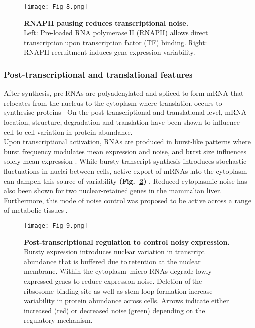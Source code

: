 \begin{figure}[!h]
\centering
\texttt{[image: Fig\_8.png]}
\caption[RNAPII pausing reduces transcriptional noise]{\textbf{RNAPII pausing reduces transcriptional noise.}\\
Left: Pre-loaded RNA polymerase II (RNAPII) allows direct transcription upon transcription factor (TF) binding. 
Right: RNAPII recruitment induces gene expression variability.}
\label{fig0:RNAPII}
\end{figure} 

\newpage

\subsubsection{Post-transcriptional and translational features}

After synthesis, pre-RNAs are polyadenylated and spliced to form mRNA that relocates from the nucleus to the cytoplasm where translation occurs to synthesise proteins \cite{Glisovic2008}. 
On the post-transcriptional and translational level, mRNA location, structure, degradation and translation have been shown to influence cell-to-cell variation in protein abundance.\\

Upon transcriptional activation, RNAs are produced in burst-like patterns where burst frequency modulates mean expression and noise, and burst size influences solely mean expression \citep{Hornung2012}. 
While bursty transcript synthesis introduces stochastic fluctuations in nuclei between cells, active export of mRNAs into the cytoplasm can dampen this source of variability \textbf{(Fig.~\ref{fig0:posttranscriptional})} \citep{Battich2015a}. 
Reduced cytoplasmic noise has also been shown for two nuclear-retained genes in the mammalian liver. 
Furthermore, this mode of noise control was proposed to be active across a range of metabolic tissues \cite{BaharHalpern2015a}.

\begin{figure}[!h]
\centering
\texttt{[image: Fig\_9.png]}
\caption[Post-transcriptional regulation to control noisy expression]{\textbf{Post-transcriptional regulation to control noisy expression.}\\
Bursty expression introduces nuclear variation in transcript abundance that is buffered due to retention at the nuclear membrane. Within the cytoplasm, micro RNAs degrade lowly expressed genes to reduce expression noise. 
Deletion of the ribsosome binding site as well as stem loop formation increase variability in protein abundance across cells. 
Arrows indicate either increased (red) or decreased noise (green) depending on the regulatory mechanism.}
\label{fig0:posttranscriptional}
\end{figure} 

